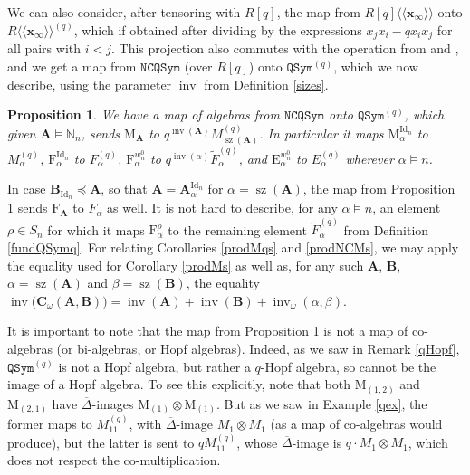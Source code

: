 \documentclass{article}
\newtheorem{prop}[thm]{Proposition}
\theoremstyle{definition}
\begin{document}
We can also consider, after tensoring with $R[q]$, the map from $R[q]\langle\langle\mathbf{x}_{\infty}\rangle\rangle$ onto $R\langle\langle\mathbf{x}_{\infty}\rangle\rangle^{(q)}$, which if obtained after dividing by the expressions $x_{j}x_{i}-qx_{i}x_{j}$ for all pairs with $i<j$. This projection also commutes with the operation from \cite{[Hi1]} and \cite{[Hi2]}, and we get a map from $\mathtt{NCQSym}$ (over $R[q]$) onto $\mathtt{QSym}^{(q)}$, which we now describe, using the parameter $\operatorname{inv}$ from Definition \ref{sizes}.
\begin{prop}
We have a map of algebras from $\mathtt{NCQSym}$ onto $\mathtt{QSym}^{(q)}$, which given $\mathbf{A}\vDash\mathbb{N}_{n}$, sends $\mathrm{M}_{\mathbf{A}}$ to $q^{\operatorname{inv}(\mathbf{A})}M_{\operatorname{sz}(\mathbf{A})}^{(q)}$. In particular it maps $\mathrm{M}_{\alpha}^{\operatorname{Id}_{n}}$ to $M_{\alpha}^{(q)}$, $\mathrm{F}_{\alpha}^{\operatorname{Id}_{n}}$ to $F_{\alpha}^{(q)}$, $\mathrm{F}_{\alpha}^{w^{0}_{n}}$ to $q^{\operatorname{inv}(\alpha)}\widetilde{F}_{\alpha}^{(q)}$, and $\mathrm{E}_{\alpha}^{w^{0}_{n}}$ to $E_{\alpha}^{(q)}$ wherever $\alpha \vDash n$. \label{projQSymq}
\end{prop}
In case $\mathbf{B}_{\operatorname{Id}_{n}}\preceq\mathbf{A}$, so that $\mathbf{A}=\mathbf{A}_{\alpha}^{\operatorname{Id}_{n}}$ for $\alpha=\operatorname{sz}(\mathbf{A})$, the map from Proposition \ref{projQSymq} sends $\mathrm{F}_{\mathbf{A}}$ to $F_{\alpha}$ as well. It is not hard to describe, for any $\alpha \vDash n$, an element $\rho \in S_{n}$ for which it maps $\mathrm{F}_{\alpha}^{\rho}$ to the remaining element $\widetilde{F}_{\alpha}^{(q)}$ from Definition \ref{fundQSymq}. For relating Corollaries \ref{prodMqs} and \ref{prodNCMs}, we may apply the equality used for Corollary \ref{prodMs} as well as, for any such $\mathbf{A}$, $\mathbf{B}$, $\alpha=\operatorname{sz}(\mathbf{A})$ and $\beta=\operatorname{sz}(\mathbf{B})$, the equality $\operatorname{inv}\big(\mathbf{C}_{\omega}(\mathbf{A},\mathbf{B})\big)=\operatorname{inv}(\mathbf{A})+\operatorname{inv}(\mathbf{B})+\operatorname{inv}_{\omega}(\alpha,\beta)$.

It is important to note that the map from Proposition \ref{projQSymq} is not a map of co-algebras (or bi-algebras, or Hopf algebras). Indeed, as we saw in Remark \ref{qHopf}, $\mathtt{QSym}^{(q)}$ is not a Hopf algebra, but rather a $q$-Hopf algebra, so cannot be the image of a Hopf algebra. To see this explicitly, note that both $\mathrm{M}_{(1,2)}$ and $\mathrm{M}_{(2,1)}$ have $\overline{\Delta}$-images $\mathrm{M}_{(1)}\otimes\mathrm{M}_{(1)}$. But as we saw in Example \ref{qex}, the former maps to $M_{11}^{(q)}$, with $\overline{\Delta}$-image $M_{1} \otimes M_{1}$ (as a map of co-algebras would produce), but the latter is sent to $qM_{11}^{(q)}$, whose $\overline{\Delta}$-image is $q \cdot M_{1} \otimes M_{1}$, which does not respect the co-multiplication.
\end{document}
